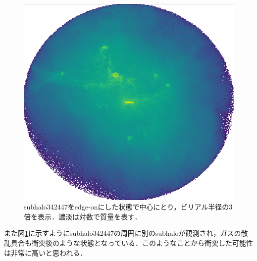 \begin{figure}[htbp]
	\centering
	\includegraphics[width=0.6\linewidth]{pic/virial3}
	\captionsetup{width=0.9\linewidth}
	\caption{subhalo342447をedge-onにした状態で中心にとり，ビリアル半径の3倍を表示．濃淡は対数で質量を表す．}
	\label{fig:virial3}
\end{figure}

また図\ref{fig:virial3}に示すようにsubhalo342447の周囲に別のsubhaloが観測され，ガスの散乱具合も衝突後のような状態となっている．このようなことから衝突した可能性は非常に高いと思われる．